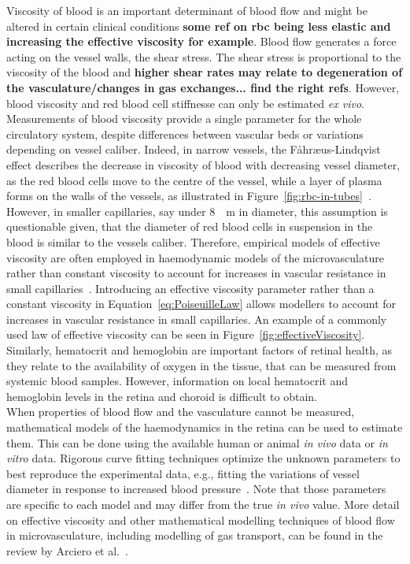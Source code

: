 \documentclass[12pt,a4paper]{journal}
\begin{document}
Viscosity of blood is an important determinant of blood flow and might be altered in certain clinical conditions \textbf{some ref on rbc being less elastic and increasing the effective viscosity for example}.
Blood flow generates a force acting on the vessel walls, the shear stress.
The shear stress is proportional to the viscosity of the blood and \textbf{higher shear rates may relate to degeneration of the vasculature/changes in gas exchanges... find the right refs}.
However, blood viscosity and red blood cell stiffnesse can only be estimated \textit{ex vivo}.
Measurements of blood viscosity provide a single parameter for the whole circulatory system, despite differences between vascular beds or variations depending on vessel caliber.
Indeed, in narrow vessels, the F\r{a}hr\ae us-Lindqvist effect describes the decrease in viscosity of blood with decreasing vessel diameter, as the red blood cells move to the centre of the vessel, while a layer of plasma forms on the walls of the vessels, as illustrated in Figure~\ref{fig:rbc-in-tubes}~\cite{F_hr_us_1931}.
However, in smaller capillaries, say under \SI{8}{\mu\meter} in diameter, this assumption is questionable given, that the diameter of red blood cells in suspension in the blood is similar to the vessels caliber.
Therefore, empirical models of effective viscosity are often employed in haemodynamic models of the microvasculature rather than constant viscosity to account for increases in vascular resistance in small capillaries~\cite{Pries_1990, Haynes_1960}.
Introducing an effective viscosity parameter rather than a constant viscosity in Equation~\ref{eq:PoiseuilleLaw} allows modellers to account for increases in vascular resistance in small capillaries.
An example of a commonly used law of effective viscosity can be seen in Figure~\ref{fig:effectiveViscosity}.\\
Similarly, hematocrit and hemoglobin are important factors of retinal health, as they relate to the availability of oxygen in the tissue, that can be measured from systemic blood samples.
However, information on local hematocrit and hemoglobin levels in the retina and choroid is difficult to obtain.\\
When properties of blood flow and the vasculature cannot be measured, mathematical models of the haemodynamics in the retina can be used to estimate them.
This can be done using the available human or animal \textit{in vivo} data or \textit{in vitro} data.
Rigorous curve fitting techniques optimize the unknown parameters to best reproduce the experimental data, e.g., fitting the variations of vessel diameter in response to increased blood pressure~\cite{Arciero_2013}.
Note that those parameters are specific to each model and may differ from the true \textit{in vivo} value.
More detail on effective viscosity and other mathematical modelling techniques of blood flow in microvasculature, including modelling of gas transport, can be found in the review by Arciero et al.~\cite{C_Arciero_2017}.
\end{document}
